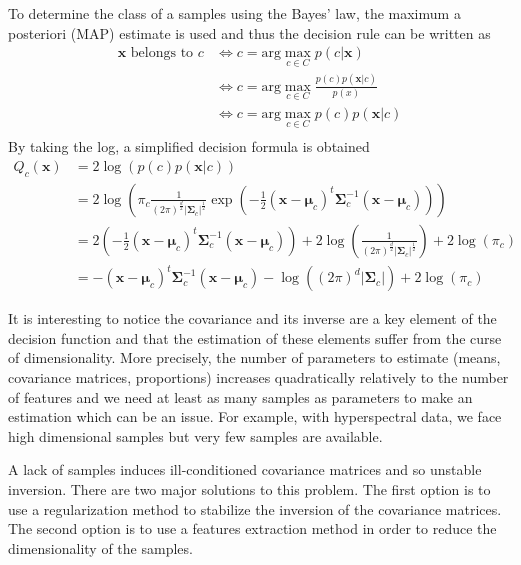 \documentclass[a4paper,11pt,DIV=16]{scrartcl}
\begin{document}
    To determine the class of a samples using the Bayes' law, the maximum a posteriori (MAP) estimate is used and thus the decision rule can be written as
    \begin{align*}
        \mathbf{x} \text{ belongs to } c &\Leftrightarrow c = \text{arg} \max_{c \in C} p(c|\mathbf{x}) \\
                                         &\Leftrightarrow c = \text{arg} \max_{c \in C} \frac{p(c) p(\mathbf{x}|c)}{p(x)} \\
                                         &\Leftrightarrow c = \text{arg} \max_{c \in C} p(c) p(\mathbf{x}|c) \\
    \end{align*}
    By taking the log, a simplified decision formula is obtained
    \begin{align}
        Q_c(\mathbf{x})
        &= 2 \log \left( p(c) p(\mathbf{x}|c) \right) \nonumber \\
        &= 2 \log \left( \pi_c \frac{1}{(2\pi)^{\frac{d}{2}} |\boldsymbol{\Sigma}_c|^{\frac{1}{2}}} \exp \left( -\frac{1}{2} (\mathbf{x} - \boldsymbol{\mu}_c)^t \boldsymbol{\Sigma}_c^{-1} (\mathbf{x} - \boldsymbol{\mu}_c) \right) \right) \nonumber \\
        &= 2 \left( -\frac{1}{2} (\mathbf{x} - \boldsymbol{\mu}_c)^t \boldsymbol{\Sigma}_c^{-1} (\mathbf{x} - \boldsymbol{\mu}_c) \right) + 2 \log \left( \frac{1}{(2\pi)^{\frac{d}{2}} |\boldsymbol{\Sigma}_c|^{\frac{1}{2}}} \right) + 2 \log (\pi_c) \nonumber \\
        &= - (\mathbf{x} - \boldsymbol{\mu}_c)^t \boldsymbol{\Sigma}_c^{-1} (\mathbf{x} - \boldsymbol{\mu}_c) - \log ((2\pi)^d|\boldsymbol{\Sigma}_c|) + 2 \log (\pi_c)
        \label{eq:decision}
    \end{align}

    It is interesting to notice the covariance and its inverse are a key element of the decision function and that the estimation of these elements suffer from the curse of dimensionality. More precisely, the number of parameters to estimate (means, covariance matrices, proportions) increases quadratically relatively to the number of features and we need at least as many samples as parameters to make an estimation which can be an issue. For example, with hyperspectral data, we face high dimensional samples but very few samples are available.

    A lack of samples induces ill-conditioned covariance matrices and so unstable inversion. There are two major solutions to this problem. The first option is to use a regularization method to stabilize the inversion of the covariance matrices. The second option is to use a features extraction method in order to reduce the dimensionality of the samples.
\end{document}
